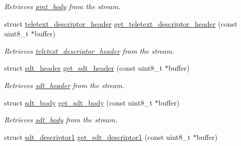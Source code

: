 \begin{DoxyCompactItemize}
\begin{DoxyCompactList}\small\item\em Retrieves \hyperlink{structpmt__body}{pmt\+\_\+body} from the stream. \end{DoxyCompactList}\item 
struct \hyperlink{structteletext__descriptor__header}{teletext\+\_\+descriptor\+\_\+header} \hyperlink{group__structure_gafbe380702060a8096a8c693c32294bf9}{get\+\_\+teletext\+\_\+descriptor\+\_\+header} (const uint8\+\_\+t $\ast$buffer)\hypertarget{group__structure_gafbe380702060a8096a8c693c32294bf9}{}\label{group__structure_gafbe380702060a8096a8c693c32294bf9}

\begin{DoxyCompactList}\small\item\em Retrieves \hyperlink{structteletext__descriptor__header}{teletext\+\_\+descriptor\+\_\+header} from the stream. \end{DoxyCompactList}\item 
struct \hyperlink{structsdt__header}{sdt\+\_\+header} \hyperlink{group__structure_ga8dccc2fbbab4df8588ea3f4154cd661a}{get\+\_\+sdt\+\_\+header} (const uint8\+\_\+t $\ast$buffer)\hypertarget{group__structure_ga8dccc2fbbab4df8588ea3f4154cd661a}{}\label{group__structure_ga8dccc2fbbab4df8588ea3f4154cd661a}

\begin{DoxyCompactList}\small\item\em Retrieves \hyperlink{structsdt__header}{sdt\+\_\+header} from the stream. \end{DoxyCompactList}\item 
struct \hyperlink{structsdt__body}{sdt\+\_\+body} \hyperlink{group__structure_gae8b16533467e7fb2a1c53b103a52542d}{get\+\_\+sdt\+\_\+body} (const uint8\+\_\+t $\ast$buffer)\hypertarget{group__structure_gae8b16533467e7fb2a1c53b103a52542d}{}\label{group__structure_gae8b16533467e7fb2a1c53b103a52542d}

\begin{DoxyCompactList}\small\item\em Retrieves \hyperlink{structsdt__body}{sdt\+\_\+body} from the stream. \end{DoxyCompactList}\item 
struct \hyperlink{structsdt__descriptor1}{sdt\+\_\+descriptor1} \hyperlink{group__structure_ga5df466f6e5e2fbd311ce4478f2693501}{get\+\_\+sdt\+\_\+descriptor1} (const uint8\+\_\+t $\ast$buffer)\hypertarget{group__structure_ga5df466f6e5e2fbd311ce4478f2693501}{}\label{group__structure_ga5df466f6e5e2fbd311ce4478f2693501}


\end{DoxyCompactItemize}
